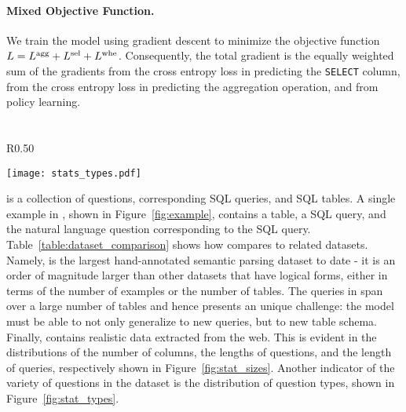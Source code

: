 \documentclass{article} %
\begin{document}
\paragraph{Mixed Objective Function.}
We train the model using gradient descent to minimize the objective function $L = L^{\rm agg} + L^{\rm sel} + L^{\rm whe}$.
Consequently, the total gradient is the equally weighted sum of the gradients from the cross entropy loss in predicting the \texttt{SELECT} column, from the cross entropy loss in predicting the aggregation operation, and from policy learning.



\section{\dataset}


\begin{wrapfigure}[13]{R}{0.50\textwidth}
\vspace{-7mm}
  \begin{center}
	\texttt{[image: stats\_types.pdf]}
  \end{center}
\vspace{-6mm}
  \caption{
  Distribution of questions in \dataset.
}\label{fig:stat_types}
\end{wrapfigure}



\dataset is a collection of questions, corresponding SQL queries, and SQL tables.
A single example in \dataset, shown in Figure~\ref{fig:example}, contains a table, a SQL query, and the natural language question corresponding to the SQL query.
Table~\ref{table:dataset_comparison} shows how \dataset compares to related datasets.
Namely, \dataset is the largest hand-annotated semantic parsing dataset to date - it is an order of magnitude larger than other datasets that have logical forms, either in terms of the number of examples or the number of tables.
The queries in \dataset span over a large number of tables and hence presents an unique challenge: the model must be able to not only generalize to new queries, but to new table schema.
Finally, \dataset contains realistic data extracted from the web.
This is evident in the distributions of the number of columns, the lengths of questions, and the length of queries, respectively shown in Figure~\ref{fig:stat_sizes}.
Another indicator of the variety of questions in the dataset is the distribution of question types, shown in Figure~\ref{fig:stat_types}.
\end{document}
